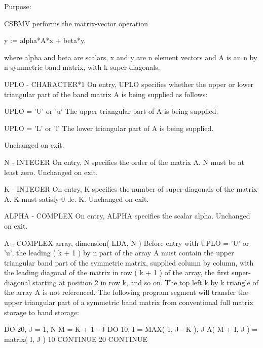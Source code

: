 \begin{DoxyParagraph}{Purpose\+: }
\begin{DoxyVerb} CSBMV  performs the matrix-vector  operation

    y := alpha*A*x + beta*y,

 where alpha and beta are scalars, x and y are n element vectors and
 A is an n by n symmetric band matrix, with k super-diagonals.\end{DoxyVerb}
 \begin{DoxyVerb}  UPLO   - CHARACTER*1
           On entry, UPLO specifies whether the upper or lower
           triangular part of the band matrix A is being supplied as
           follows:

              UPLO = 'U' or 'u'   The upper triangular part of A is
                                  being supplied.

              UPLO = 'L' or 'l'   The lower triangular part of A is
                                  being supplied.

           Unchanged on exit.

  N      - INTEGER
           On entry, N specifies the order of the matrix A.
           N must be at least zero.
           Unchanged on exit.

  K      - INTEGER
           On entry, K specifies the number of super-diagonals of the
           matrix A. K must satisfy  0 .le. K.
           Unchanged on exit.

  ALPHA  - COMPLEX
           On entry, ALPHA specifies the scalar alpha.
           Unchanged on exit.

  A      - COMPLEX array, dimension( LDA, N )
           Before entry with UPLO = 'U' or 'u', the leading ( k + 1 )
           by n part of the array A must contain the upper triangular
           band part of the symmetric matrix, supplied column by
           column, with the leading diagonal of the matrix in row
           ( k + 1 ) of the array, the first super-diagonal starting at
           position 2 in row k, and so on. The top left k by k triangle
           of the array A is not referenced.
           The following program segment will transfer the upper
           triangular part of a symmetric band matrix from conventional
           full matrix storage to band storage:

                 DO 20, J = 1, N
                    M = K + 1 - J
                    DO 10, I = MAX( 1, J - K ), J
                       A( M + I, J ) = matrix( I, J )
              10    CONTINUE
              20 CONTINUE


\end{DoxyVerb}
\end{DoxyParagraph}
